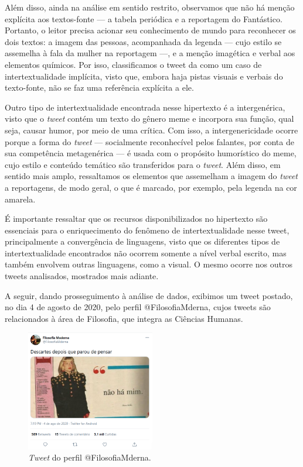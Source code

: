 \documentclass{textolivre}
\begin{document}
Além disso, ainda na análise em sentido restrito, observamos que não há menção explícita aos textos-fonte — a tabela periódica e a reportagem do Fantástico. Portanto, o leitor precisa acionar seu conhecimento de mundo para reconhecer os dois textos: a imagem das pessoas, acompanhada da legenda — cujo estilo se assemelha à fala da mulher na reportagem —, e a menção imagética e verbal aos elementos químicos. Por isso, classificamos o tweet da  como um caso de intertextualidade implícita, visto que, embora haja pistas visuais e verbais do texto-fonte, não se faz uma referência explícita a ele.

Outro tipo de intertextualidade encontrada nesse hipertexto é a intergenérica, visto que o \textit{tweet} contém um texto do gênero meme e incorpora sua função, qual seja, causar humor, por meio de uma crítica. Com isso, a intergenericidade ocorre porque a forma do \textit{tweet} — socialmente reconhecível pelos falantes, por conta de sua competência metagenérica — é usada com o propósito humorístico do meme, cujo estilo e conteúdo temático são transferidos para o \textit{tweet}. Além disso, em sentido mais amplo, ressaltamos os elementos que assemelham a imagem do \textit{tweet} a reportagens, de modo geral, o que é marcado, por exemplo, pela legenda na cor amarela.

É importante ressaltar que os recursos disponibilizados no hipertexto são essenciais para o enriquecimento do fenômeno de intertextualidade nesse tweet, principalmente a convergência de linguagens, visto que os diferentes tipos de intertextualidade encontrados não ocorrem somente a nível verbal escrito, mas também envolvem outras linguagens, como a visual. O mesmo ocorre nos outros tweets analisados, mostrados mais adiante. 

A seguir, dando prosseguimento à análise de dados, exibimos um tweet postado, no dia 4 de agosto de 2020, pelo perfil @FilosofiaMderna, cujos tweets são relacionados à área de Filosofia, que integra as Ciências Humanas.

\begin{figure}[htbp]
 \centering
 \includegraphics[width=0.5\textwidth]{Fig4.png}
 \caption{\textit{Tweet} do perfil @FilosofiaMderna.}
 \label{fig04}
\end{figure}
\end{document}

